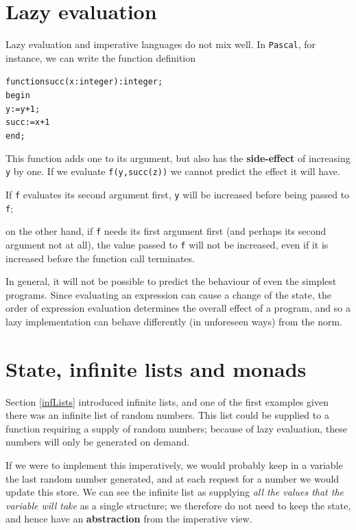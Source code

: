 \section*{Lazy evaluation}
\vspace{-3pt}

Lazy evaluation and imperative languages do not mix well. In \texttt{Pascal},
for instance, we can write the function definition
\begin{alltt}
function succ(x : integer):integer;
begin
  y    := y+1;
  succ := x+1
end;
\end{alltt}
This function adds one to its argument, but also has the \textbf{side-effect\/}
of increasing \texttt{y} by one. If we evaluate \texttt{f(y,succ(z))} we cannot
predict the effect it will have.
\begin{titemize}
\item If \texttt{f} evaluates its second argument first, \texttt{y} will be
increased before being passed to \texttt{f}; 
\item on the other hand, if \texttt{f} needs its first argument first (and perhaps its second
argument not at all), the value passed to \texttt{f} will not be increased, even
if it is increased before the function call terminates.
\end{titemize}
In general, it will not be possible to predict the behaviour of even the
simplest programs. Since evaluating an expression can cause a change of the
state, the order of expression evaluation determines the overall effect of a
program, and so a lazy implementation can behave differently (in unforeseen
ways) from the norm.

\section*{State, infinite lists and monads}

Section \ref{infLists} introduced infinite lists, and one of the first
examples given there was an infinite list of random numbers. This list could
be supplied to a function requiring a supply of random numbers; because of lazy
evaluation, these numbers will only be generated on demand. 

If we were to implement this imperatively, we would probably keep in a
variable the last random number generated, and at each request for a
number we would update this store. We can see the infinite list as supplying
{\em all the values that the variable will take\/} as a single structure; we
therefore do not need to keep the state, and hence have an \textbf{abstraction\/} from the imperative view.

